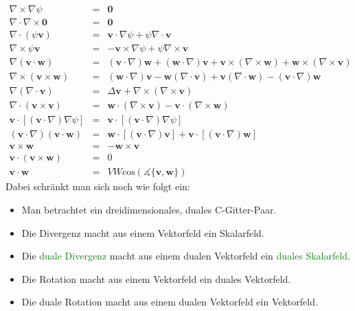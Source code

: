 \documentclass{book}
\renewcommand{\cos}{\text{cos}}
\begin{document}
\begin{eqnarray}
\nabla\times\nabla\psi & = & \mathbf{0}\\
\nabla\cdot\nabla\times{\mathbf{0}} & = & \mathbf{0}\\
\nabla\cdot\left(\psi\mathbf{v}\right) & = & \mathbf{v}\cdot\nabla\psi + \psi\nabla\cdot\mathbf{v}\\
\nabla\times\psi\mathbf{v} & = & -\mathbf{v}\times\nabla\psi + \psi\nabla\times\mathbf{v}\\
\nabla\left(\mathbf{v}\cdot\mathbf{w}\right) & = & \left(\mathbf{v}\cdot\nabla\right)\mathbf{w} + \left(\mathbf{w}\cdot\nabla\right)\mathbf{v} + \mathbf{v}\times\left(\nabla\times\mathbf{w}\right) + \mathbf{w}\times\left(\nabla\times\mathbf{v}\right)\\
\nabla\times\left(\mathbf{v}\times\mathbf{w}\right) & = & \left(\mathbf{w}\cdot\nabla\right)\mathbf{v} - \mathbf{w}\left(\nabla\cdot\mathbf{v}\right) + \mathbf{v}\left(\nabla\cdot\mathbf{w}\right) - \left(\mathbf{v}\cdot\nabla\right)\mathbf{w}\\
\nabla\left(\nabla\cdot\mathbf{v}\right) & = & \Delta\mathbf{v} + \nabla\times\left(\nabla\times\mathbf{v}\right)\\
\nabla\cdot\left(\mathbf{v}\times\mathbf{v}\right) & = & \mathbf{w}\cdot\left(\nabla\times\mathbf{v}\right) - \mathbf{v}\cdot\left(\nabla\times\mathbf{w}\right)\\
\mathbf{v}\cdot\left[\left(\mathbf{v}\cdot\nabla\right)\nabla\psi\right] & = & \mathbf{v}\cdot\left[\left(\mathbf{v}\cdot\nabla\right)\nabla\psi\right]\\
\left(\mathbf{v}\cdot\nabla\right)\left(\mathbf{v}\cdot\mathbf{w}\right) & = & \mathbf{w}\cdot\left[\left(\mathbf{v}\cdot\nabla\right)\mathbf{v}\right] + \mathbf{v}\cdot\left[\left(\mathbf{v}\cdot\nabla\right)\mathbf{w}\right]\\
\mathbf{v}\times\mathbf{w} & = & -\mathbf{w}\times\mathbf{v}\\
\mathbf{v}\cdot\left(\mathbf{v}\times\mathbf{w}\right) & = & 0\\
\mathbf{v}\cdot\mathbf{w} & = & VW\cos\left(\measuredangle\{\mathbf{v}, \mathbf{w}\}\right)
\end{eqnarray}
%
Dabei schränkt man sich noch wie folgt ein:
%
\begin{itemize}
\item Man betrachtet ein dreidimensionales, duales C-Gitter-Paar.
\item Die Divergenz macht aus einem Vektorfeld ein Skalarfeld.
\item Die \textcolor{green}{duale Divergenz} macht aus einem dualen Vektorfeld ein \textcolor{green}{duales Skalarfeld}.
\item Die Rotation macht aus einem Vektorfeld ein duales Vektorfeld.
\item Die duale Rotation macht aus einem dualen Vektorfeld ein Vektorfeld.
\end{itemize}
\end{document}
